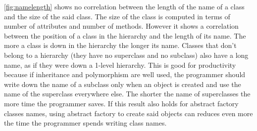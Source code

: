 \ref{fig:namelength} shows no correlation between the length of the name of a class and the size of the said class. The size of the class is computed in terms of number of attributes and number of methods.
However it shows a correlation between the position of a class in the hierarchy and the length of its name. The more a class is down in the hierarchy the longer its name. Classes that don't belong to a hierarchy (they have no superclass and no subclass) also have a long name, as if they were down a 1-level hierarchy. This is good for productivity because if inheritance and polymorphism are well used, the programmer should write down the name of a subclass only when an object is created and use the name of the superclass everywhere else. The shorter the name of superclasses the more time the programmer saves. If this result also holds for abstract factory classes names, using abstract factory to create said objects can reduces even more the time the programmer spends writing class names.